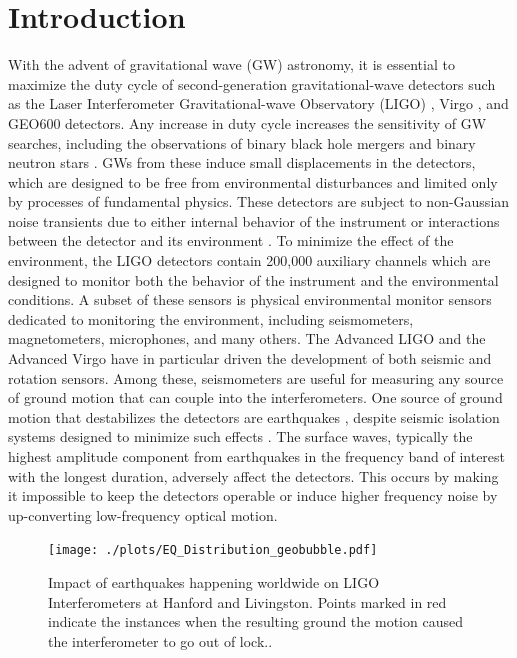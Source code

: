 \documentclass[reprint, prl, aps, showpacs]{revtex4-1}
\begin{document}
\section{Introduction}
With the advent of gravitational wave (GW) astronomy, it is essential to maximize the duty cycle of second-generation gravitational-wave detectors such as the Laser Interferometer Gravitational-wave Observatory (LIGO) \cite{aligo}, Virgo \cite{avirgo}, and GEO600 \cite{Gr2010} detectors.
Any increase in duty cycle increases the sensitivity of GW searches, including the observations of binary black hole mergers \cite{AbEA2016a,AbEA2016e,AbEA2017a,AbEA2017c} and binary neutron stars \cite{AbEA2017b}. GWs from these induce small displacements in the detectors, which are designed to be free from environmental disturbances and limited only by processes of fundamental physics.
These detectors are subject to non-Gaussian noise transients due to either internal behavior of the instrument or interactions between the detector and its environment \cite{AbEA2016f}. To minimize the effect of the environment, the LIGO detectors contain 200,000 auxiliary channels which are designed to monitor both the behavior of the instrument and the environmental conditions.
A subset of these sensors is physical environmental monitor sensors dedicated to monitoring the environment, including seismometers, magnetometers, microphones, and many others.  The Advanced LIGO \cite{aligo} and the Advanced Virgo \cite{avirgo} have in particular driven the development of both seismic \cite{BeCa2016} and rotation \cite{VeHa2014} sensors. Among these, seismometers are useful for measuring any source of ground motion that can couple into the interferometers. One source of ground motion that destabilizes the detectors are earthquakes
\cite{CoSt2015,CoEa2017}, despite seismic isolation systems designed to minimize such effects \cite{AbAd2002,StAb2009,MaLa2015}.
The surface waves, typically the highest amplitude component from earthquakes in the frequency band of interest with the longest duration, adversely affect the detectors. 
This occurs by making it impossible to keep the detectors operable or induce higher frequency noise by up-converting low-frequency optical motion.

\begin{figure}[!htb]
  \texttt{[image: ./plots/EQ\_Distribution\_geobubble.pdf]}
 \caption{Impact of earthquakes happening worldwide on LIGO Interferometers at Hanford
and Livingston. Points marked in red indicate the instances when the resulting ground
the motion caused the interferometer to go out of lock..}
 \label{fig:eq_worldwide}
\end{figure}
\end{document}
